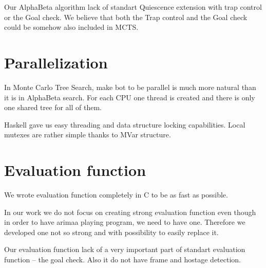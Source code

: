 Our AlphaBeta algorithm lack of standart Quiescence extension with trap control
or the Goal check. We believe that both the Trap control and the Goal check
could be somehow also included in MCTS.

\section{Parallelization}
In Monte Carlo Tree Search, make bot to be parallel is much more natural than
it is in AlphaBeta search. For each CPU one thread is created and there is only
one shared tree for all of them.

Haskell gave us easy threading and data structure locking capabilities.
Local mutexes are rather simple thanks to MVar structure.



\section{Evaluation function}
We wrote evaluation function completely in C to be as fast as possible.

In our work we do not focus on creating strong evaluation function even though
in order to have arimaa playing program, we need to have one. Therefore we
developed one not so strong and with possibility to easily replace it.

Our evaluation function lack of a very important part of standart evaluation
function -- the goal check.
Also it do not have frame and hostage detection.
